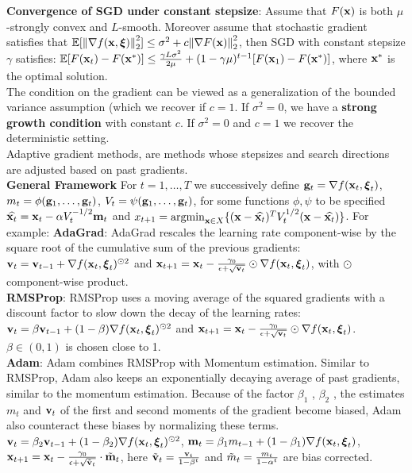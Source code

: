 \textbf{Convergence of SGD under constant stepsize}: Assume that $F(\mathbf{x})$ is both $\mu$-strongly convex and $L$-smooth. Moreover assume that stochastic gradient satisfies that $\mathbb{E}[\norm{\nabla f(\mathbf{x}, \boldsymbol{\xi})}_2^2] \leq \sigma^2 + c \norm{\nabla F(\mathbf{x})}_2^2$, then SGD with constant stepsize $\gamma$ satisfies: $\mathbb{E}[F(\mathbf{x}_t) - F(\mathbf{x}^*)] \leq \frac{\gamma L \sigma^2}{2\mu} + (1 - \gamma \mu)^{t-1}[F(\mathbf{x}_1) - F(\mathbf{x}^*)]$, where $\mathbf{x}^*$ is the optimal solution. \\
The condition on the gradient can be viewed as a generalization of the bounded variance assumption (which we recover if $c=1$. If $\sigma^2 = 0$, we have a \textbf{strong growth condition} with constant $c$. If $\sigma^2 =0$ and $c=1$ we recover the deterministic setting. \\
Adaptive gradient methods, are methods whose stepsizes and search directions are adjusted based on past gradients. \\
\textbf{General Framework} For $t =1, \dots, T$ we successively define $\mathbf{g}_t = \nabla f(\mathbf{x}_t, \boldsymbol{\xi}_t)$, $m_t = \phi(\mathbf{g}_1, \dots, \mathbf{g}_t)$, $V_t = \psi(\mathbf{g}_1, \dots, \mathbf{g}_t)$, for some functions $\phi, \psi$ to be specified $\widehat{\mathbf{x}_t} = \mathbf{x}_t - \alpha V_t^{-1/2} \mathbf{m}_t$ and $x_{t+1} = \mathrm{argmin}_{\mathbf{x} \in X} \{(\mathbf{x} - \widehat{\mathbf{x}_t})^T V_t^{1/2}(\mathbf{x} - \widehat{\mathbf{x}_t})\}$. For example:
\textbf{AdaGrad}: AdaGrad rescales the learning rate component-wise by the square root of the cumulative sum of the previous gradients: $\mathbf{v}_t = \mathbf{v}_{t-1} + \nabla f(\mathbf{x}_t, \boldsymbol{\xi}_t)^{\odot 2}$ and $\mathbf{x}_{t+1} = \mathbf{x}_t - \frac{\gamma_0}{\epsilon + \sqrt{\mathbf{v}_t}}\odot \nabla f(\mathbf{x}_t, \boldsymbol{\xi}_t)$, with $\odot$ component-wise product. \\
\textbf{RMSProp}: RMSProp uses a moving average of the squared gradients with a discount factor to slow down the decay of the learning rates: $\mathbf{v}_t = \beta \mathbf{v}_{t-1} + (1 - \beta) \nabla f(\mathbf{x}_t, \boldsymbol{\xi}_t)^{\odot 2}$ and $\mathbf{x}_{t+1} = \mathbf{x}_t - \frac{\gamma_0}{\epsilon + \sqrt{\mathbf{v}_t}}\odot \nabla f(\mathbf{x}_t, \boldsymbol{\xi}_t)$. $\beta \in (0, 1)$ is chosen close to 1. \\
\textbf{Adam}: Adam combines RMSProp with Momentum estimation. Similar to RMSProp, Adam also keeps an exponentially decaying average of past gradients, similar to the momentum estimation. Because
of the factor $\beta_1$ , $\beta_2$ , the estimates $m_t$ and $\mathbf{v}_t$ of the first and second moments of the gradient become biased, Adam also counteract these biases by normalizing these terms. $\mathbf{v}_t = \beta_2 \mathbf{v}_{t-1} + (1 - \beta_2) \nabla f(\mathbf{x}_t, \boldsymbol{\xi}_t)^{\odot 2}$, $\mathbf{m}_t = \beta_1 m_{t-1} + (1 - \beta_1) \nabla f(\mathbf{x}_t, \boldsymbol{\xi}_t)$, $\mathbf{x}_{t+1} = \mathbf{x}_t - \frac{\gamma_0}{\epsilon + \sqrt{\Tilde{\mathbf{v}}_t}}\cdot \Tilde{\mathbf{m}}_t$, here $\Tilde{\mathbf{v}}_t = \frac{\mathbf{v}_t}{1 - \beta^t}$ and $\Tilde{m}_t = \frac{m_t}{1 - \alpha^t}$ are bias corrected.